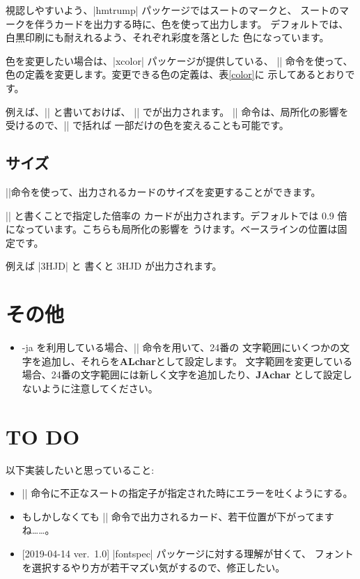\documentclass{jlreq}
\begin{document}
視認しやすいよう、|hmtrump| パッケージではスートのマークと、
スートのマークを伴うカードを出力する時に、色を使って出力します。
デフォルトでは、白黒印刷にも耐えれるよう、それぞれ彩度を落とした
色になっています。

色を変更したい場合は、|xcolor| パッケージが提供している、 |\definecolor|
命令を使って、色の定義を変更します。変更できる色の定義は、表\ref{color}に
示してあるとおりです。

例えば、|| と書いておけば、
|\hmH| で{\hmH}が出力されます。
|\definecolor| 命令は、局所化の影響を受けるので、|{}| で括れば
一部だけの色を変えることも可能です。

\subsection{サイズ}
|\tikzset|命令を使って、出力されるカードのサイズを変更することができます。

|| と書くことで指定した倍率の
カードが出力されます。デフォルトでは 0.9 倍になっています。こちらも局所化の影響を
うけます。ベースラインの位置は固定です。

例えば |{\trump 3H}\trump JD| と
書くと {\trump 3H}\trump JD が出力されます。

\section{その他}
\begin{itemize}
\item \LuaLaTeX-ja を利用している場合、|\ltjdefcharrange| 命令を用いて、24番の
	文字範囲にいくつかの文字を追加し、それらを\textbf{ALchar}として設定します。
	文字範囲を変更している場合、24番の文字範囲には新しく文字を追加したり、\textbf{JAchar}
	として設定しないように注意してください。
\end{itemize}

\section{TO DO}
以下実装したいと思っていること:
\begin{itemize}
\item |\trump| 命令に不正なスートの指定子が指定された時にエラーを吐くようにする。
\item もしかしなくても |\joker| 命令で出力されるカード、若干位置が下がってますね……。
\item {[2019-04-14 ver.~1.0]} |fontspec| パッケージに対する理解が甘くて、
	フォントを選択するやり方が若干マズい気がするので、修正したい。
\end{itemize}
\end{document}
